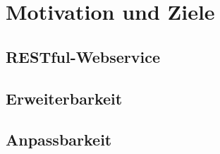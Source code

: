 \section{Motivation und Ziele}

\subsection{RESTful-Webservice}

\subsection{Erweiterbarkeit}

\subsection{Anpassbarkeit}